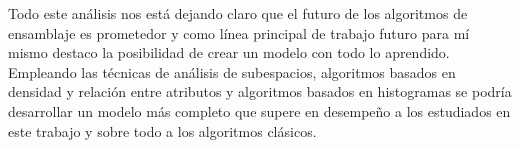 Todo este análisis nos está dejando claro que el futuro de los algoritmos de ensamblaje es prometedor y como línea principal de trabajo futuro para mí mismo destaco la posibilidad de crear un modelo con todo lo aprendido. Empleando las técnicas de análisis de subespacios, algoritmos basados en densidad y relación entre atributos y algoritmos basados en histogramas se podría desarrollar un modelo más completo que supere en desempeño a los estudiados en este trabajo y sobre todo a los algoritmos clásicos.